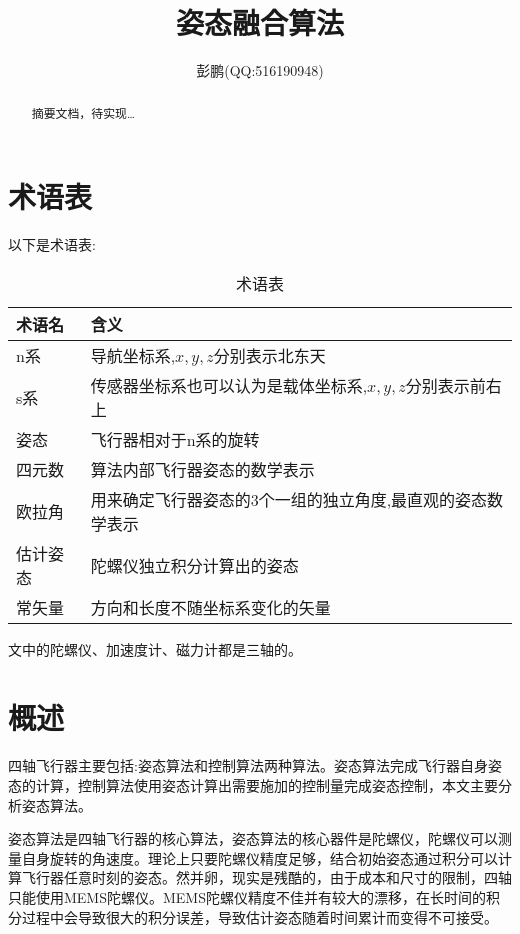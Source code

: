 \documentclass[10pt,a4paper]{article}
\title{姿态融合算法}
\author{彭鹏(QQ:516190948)}
\renewcommand{\citep}[1]{\textsuperscript{\cite{#1}}}
\begin{document}
\maketitle
\newpage
\tableofcontents
\listoffigures
\listoftables

\begin{abstract}
    摘要文档，待实现\ldots
\end{abstract}
\newpage

\section{术语表} 
以下是术语表:
\begin{table}[!hbp]
\begin{center}
    \begin{tabular}{|l|l|}
        \hline
        术语名 & 含义 \\
        \hline
        n系 & 导航坐标系,$x,y,z$分别表示北东天 \\
        \hline
        s系 & 传感器坐标系也可以认为是载体坐标系,$x,y,z$分别表示前右上 \\
        \hline
        姿态 & 飞行器相对于n系的旋转 \\
        \hline
        四元数 & 算法内部飞行器姿态的数学表示 \\
        \hline
        欧拉角 & 用来确定飞行器姿态的3个一组的独立角度,最直观的姿态数学表示 \\
        \hline
        估计姿态 & 陀螺仪独立积分计算出的姿态 \\
        \hline
        常矢量 & 方向和长度不随坐标系变化的矢量 \\
        \hline
    \end{tabular}
    \caption{术语表\label{术语表}}
\end{center}
\end{table}

文中的陀螺仪、加速度计、磁力计都是三轴的。
\newpage

\section{概述}
四轴飞行器主要包括:姿态算法和控制算法两种算法。姿态算法完成飞行器自身姿态的计算，控制算法使用姿态计算出需要施加的控制量完成姿态控制，本文主要分析姿态算法。

姿态算法是四轴飞行器的核心算法，姿态算法的核心器件是陀螺仪，陀螺仪可以测量自身旋转的角速度。理论上只要陀螺仪精度足够，结合初始姿态通过积分可以计算飞行器任意时刻的姿态。然并卵，现实是残酷的，由于成本和尺寸的限制，四轴只能使用MEMS陀螺仪。MEMS陀螺仪精度不佳并有较大的漂移，在长时间的积分过程中会导致很大的积分误差，导致估计姿态随着时间累计而变得不可接受\citep{捷联惯导航}。
\end{document}
